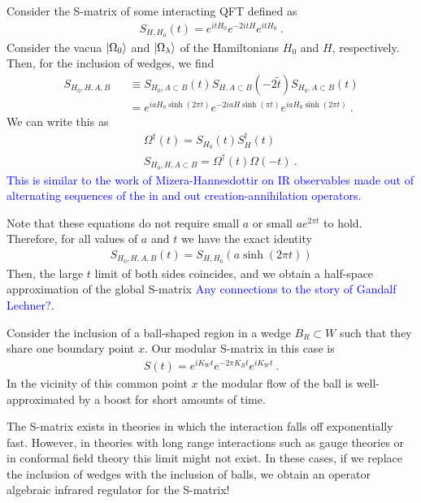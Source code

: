\documentclass[a4paper,11pt]{article}
\theoremstyle{definition}
\newcommand{\nn}{\nonumber}
\newcommand{\NL}[1]{\textcolor{blue}{#1}}
\begin{document}
Consider the S-matrix of some interacting QFT defined as
\begin{eqnarray}
S_{H,H_0}(t)=e^{i t H_0}e^{-2i t H}e^{it H_0}\ .
\end{eqnarray}
Consider the vacua $\ket{\Omega_0}$ and $\ket{\Omega_\lambda}$ of the Hamiltonians $H_0$ and $H$, respectively. Then, for the inclusion of wedges, we find
\begin{eqnarray}
S_{H_0,H,A,B}&&\equiv S_{H_0,A\subset B}(t) S_{H,A\subset B}(-2\tilde{t})S_{H_0,A\subset B}(t)\nn\\
&&=e^{i a H_0 \sinh(2\pi t)} e^{-2i a H \sinh(\pi t)}e^{i a H_0 \sinh(2\pi t)}\ .
\end{eqnarray}
We can write this as 
\begin{eqnarray}
    &&\Omega^\dagger(t)=S_{H_0}(t) S^\dagger_{H}(t)\nn\\
    &&S_{H_0,H,A\subset B}=\Omega^\dagger(t) \Omega(-t)\ .
\end{eqnarray}
\NL{This is similar to the work of Mizera-Hannesdottir on IR observables made out of alternating sequences of the in and out creation-annihilation operators.}


Note that these equations do not require small $a$ or small $ae^{2\pi t}$ to hold. Therefore, for all values of $a$ and $t$ we have the exact identity
\begin{eqnarray}
S_{H_0,H,A,B}(t)=S_{H,H_0}(a \sinh(2\pi t)) 
\end{eqnarray} 
Then, the large $t$ limit of both sides coincides, and we obtain a half-space approximation of the global S-matrix \NL{Any connections to the story of Gandalf Lechner?}.

Consider the inclusion of a ball-shaped region in a wedge $B_R\subset W$ such that they share one boundary point $x$. Our modular S-matrix in this case is
\begin{eqnarray}
S(t)=e^{i K_W t} e^{-2\pi K_B t} e^{i K_W t}\ .
\end{eqnarray}
In the vicinity of this common point $x$ the modular flow of the ball is well-approximated by a boost for short amounts of time. 


The S-matrix exists in theories in which the interaction falls off exponentially fast. However, in theories with long range interactions such as gauge theories or in conformal field theory this limit might not exist. In these cases, if we replace the inclusion of wedges with the inclusion of balls, we obtain an operator algebraic infrared regulator for the S-matrix!
\end{document}
